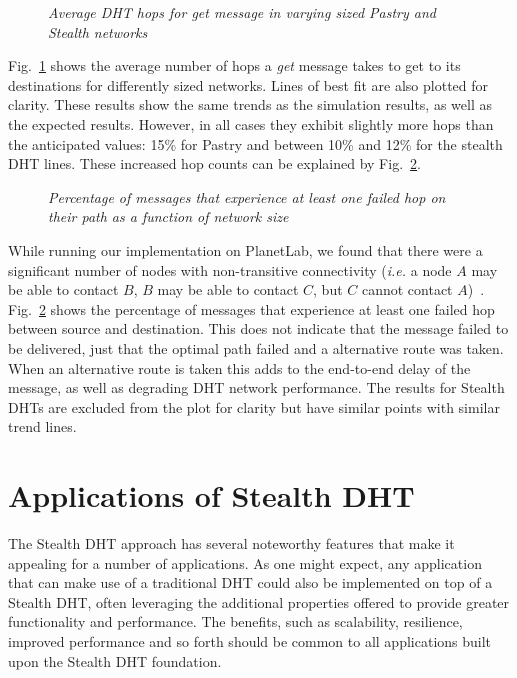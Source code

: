 \documentclass[letterpaper]{sig-alternate} %
\begin{document}
\begin{figure}[tb]
\centering {}
\caption{\em Average DHT hops for get message in varying sized Pastry and
Stealth networks} \label{fig:imp_gethops}
\end{figure}

Fig.~\ref{fig:imp_gethops} shows the average number of hops a
\emph{get} message takes to get to its destinations for differently
sized networks. Lines of best fit are also plotted for clarity.
These results show the same trends as the simulation results, as
well as the expected results. However, in all cases they exhibit
slightly more hops than the anticipated values: 15\% for Pastry and
between 10\% and 12\% for the stealth DHT lines. These increased hop
counts can be explained by Fig.~\ref{fig:imp_failedpaths}.

\begin{figure}[tb]
\centering {}
\caption{\em Percentage of messages that experience at least one failed hop on
their path as a function of network size} \label{fig:imp_failedpaths}
\end{figure}

While running our implementation on PlanetLab, we found that there were
a significant number of nodes with non-transitive connectivity
(\emph{i.e.} a node $A$ may be able to contact $B$, $B$ may be able to
contact $C$, but $C$ cannot contact $A$)~\cite{nontransitivity}.
Fig.~\ref{fig:imp_failedpaths} shows the percentage of messages that
experience at least one failed hop between source and destination. This
does not indicate that the message failed to be delivered, just that
the optimal path failed and a alternative route was taken. When an
alternative route is taken this adds to the end-to-end delay of the
message, as well as degrading DHT network performance. The results for
Stealth DHTs are excluded from the plot for clarity but have similar
points with similar trend lines.

\section{Applications of Stealth DHT}
\label{sect-applications}

The Stealth DHT approach has several noteworthy features that make
it appealing for a number of applications. As one might expect, any
application that can make use of a traditional DHT could also be
implemented on top of a Stealth DHT, often leveraging the additional
properties offered to provide greater functionality and performance.
The benefits, such as scalability, resilience, improved performance
and so forth should be common to all applications built upon the
Stealth DHT foundation.
\end{document}
